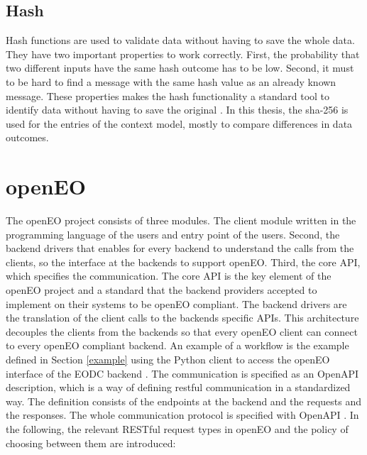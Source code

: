 \documentclass[draft,final]{vutinfth} %
\begin{document}
\subsection{Hash}\label{Hash}
Hash functions are used to validate data without having to save the whole data. They have two
important properties to work correctly. First, the probability that two different inputs have the same hash outcome has to be low. Second, it must to be hard to find a message with the same hash value as an already known message. These properties makes the hash functionality a standard tool to identify data without having to save the original \cite{3b412889270f46f59740fbf1ca8cd7e0}.  
In this thesis, the \gls{sha}-256 is used for the entries of the context model, mostly to compare differences in data outcomes.


\section{openEO}\label{openEO}
The openEO project consists of three modules. The client module written in the programming language of the users and entry point of the users. Second, the backend drivers that enables for every backend to understand the calls from the clients, so the interface at the backends to support openEO. Third, the core API, which specifies the communication. The core API is the key element of the openEO project and a standard that the backend providers accepted to implement on their systems to be openEO compliant. The backend drivers are the translation of the client calls to the backends specific APIs. This architecture decouples the clients from the backends so that every openEO client can connect to every openEO compliant backend. An example of a workflow is the example defined in Section \ref{example} using the Python client to access the openEO interface of the EODC backend \cite{openeo}. 
\newpage
The communication is specified as an OpenAPI description, which is a way of defining \gls{rest}ful communication in a standardized way. The definition consists of the endpoints at the backend and the requests and the responses. The whole communication protocol is specified with OpenAPI \cite{openapi}. 
In the following, the relevant RESTful request types in openEO and the policy of choosing between them are introduced:
\end{document}
